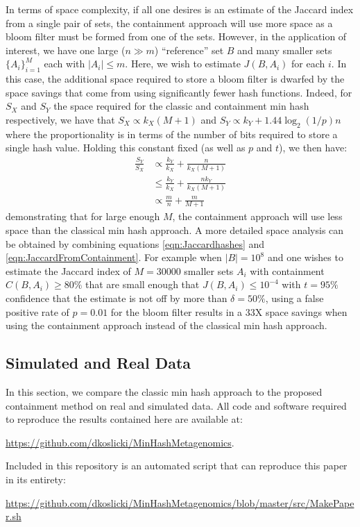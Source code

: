 \documentclass[11pt,reqno]{amsart}
\theoremstyle{remark}
\numberwithin{equation}{section}
\newcommand{\classicX}{X}
\newcommand{\containX}{Y}
\begin{document}
In terms of space complexity, if all one desires is an estimate of the Jaccard index from a single pair of sets, the containment approach will use more space as a bloom filter must be formed from one of the sets. However, in the application of interest, we have one large ($n\gg m$) ``reference'' set $B$ and many smaller sets $\{A_i\}_{i=1}^M$ each with $|A_i|\leq m$. Here, we wish to estimate $J(B,A_i)$ for each $i$. In this case, the additional space required to store a bloom filter is dwarfed by the space savings that come from using significantly fewer hash functions. Indeed, for $S_\classicX$ and $S_\containX$ the space required for the classic and containment min hash respectively, we have that $S_\classicX \propto k_\classicX (M+1)$ and $S_\containX \propto k_\containX + 1.44 \log_2(1/p)n$ where the proportionality is in terms of the number of bits required to store a single hash value. Holding this constant fixed (as well as $p$ and $t$), we then have:
\begin{align}
\label{eqn:size}
\frac{S_\containX}{S_\classicX} &\propto \frac{k_\containX}{k_\classicX} +\frac{n}{k_\classicX (M+1)}\\
&\leq \frac{k_\containX}{k_\classicX} +\frac{nk_\containX}{k_\classicX (M+1)}\\
&\propto \frac{m}{n}+\frac{m}{M+1}
\end{align}
demonstrating that for large enough $M$, the containment approach will use less space than the classical min hash approach. A more detailed space analysis can be obtained by combining equations \eqref{eqn:Jaccardhashes} and \eqref{eqn:JaccardFromContainment}. For example when $|B|=10^8$ and one wishes to estimate the Jaccard index of $M=30000$ smaller sets $A_i$ with containment $C(B,A_i)\geq 80\%$ that are small enough that $J(B,A_i)\leq 10^{-4}$ with $t=95\%$ confidence that the estimate is not off by more than $\delta=50\%$, using a false positive rate of $p=0.01$ for the bloom filter results in a 33X space savings when using the containment approach instead of the classical min hash approach.



\subsection{Simulated and Real Data}
In this section, we compare the classic min hash approach to the proposed containment method on real and simulated data. All code and software required to reproduce the results contained here are available at:
\begin{center}
 \url{https://github.com/dkoslicki/MinHashMetagenomics}.
\end{center}
Included in this repository is an automated script that can reproduce this paper in its entirety:
\begin{center}
\url{https://github.com/dkoslicki/MinHashMetagenomics/blob/master/src/MakePaper.sh}
\end{center}
\end{document}
